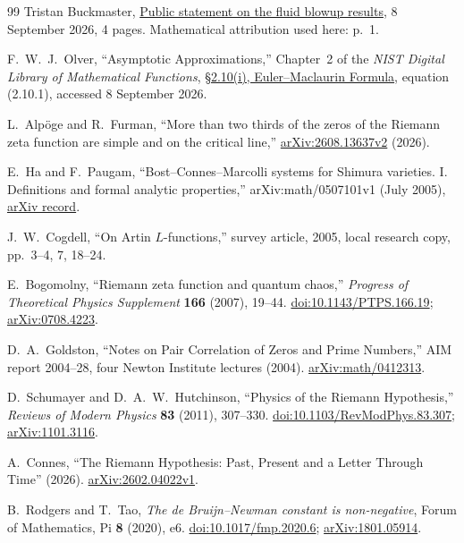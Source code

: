 \begin{thebibliography}{99}
Tristan Buckmaster,
\href{https://cims.nyu.edu/~tristanb/statement.pdf}{Public statement
on the fluid blowup results}, 8 September 2026, 4 pages.
Mathematical attribution used here: p.~1.

F.~W.~J.~Olver,
``Asymptotic Approximations,'' Chapter~2 of the
\emph{NIST Digital Library of Mathematical Functions},
\href{https://dlmf.nist.gov/2.10}{\S2.10(i), Euler--Maclaurin Formula},
equation (2.10.1), accessed 8 September 2026.

L.~Alp\"oge and R.~Furman,
``More than two thirds of the zeros of the Riemann zeta function are simple
and on the critical line,''
\href{https://arxiv.org/abs/2608.13637v2}{arXiv:2608.13637v2} (2026).

E.~Ha and F.~Paugam,
``Bost--Connes--Marcolli systems for Shimura varieties. I. Definitions and
formal analytic properties,''
arXiv:math/0507101v1 (July 2005),
\href{https://arxiv.org/abs/math/0507101}{arXiv record}.

J.~W.~Cogdell,
``On Artin $L$-functions,'' survey article, 2005,
local research copy, pp.~3--4, 7, 18--24.
\small\raggedright

E.~Bogomolny,
``Riemann zeta function and quantum chaos,''
\emph{Progress of Theoretical Physics Supplement} \textbf{166} (2007), 19--44.
\href{https://doi.org/10.1143/PTPS.166.19}{doi:10.1143/PTPS.166.19};
\href{https://arxiv.org/abs/0708.4223}{arXiv:0708.4223}.

D.~A.~Goldston,
``Notes on Pair Correlation of Zeros and Prime Numbers,''
AIM report 2004--28, four Newton Institute lectures (2004).
\href{https://arxiv.org/abs/math/0412313}{arXiv:math/0412313}.

D.~Schumayer and D.~A.~W.~Hutchinson,
``Physics of the Riemann Hypothesis,''
\emph{Reviews of Modern Physics} \textbf{83} (2011), 307--330.
\href{https://doi.org/10.1103/RevModPhys.83.307}{doi:10.1103/RevModPhys.83.307};
\href{https://arxiv.org/abs/1101.3116}{arXiv:1101.3116}.

A.~Connes,
``The Riemann Hypothesis: Past, Present and a Letter Through Time'' (2026).
\href{https://arxiv.org/abs/2602.04022}{arXiv:2602.04022v1}.

B.~Rodgers and T.~Tao,
\emph{The de Bruijn--Newman constant is non-negative},
Forum of Mathematics, Pi \textbf{8} (2020), e6.
\href{https://doi.org/10.1017/fmp.2020.6}{doi:10.1017/fmp.2020.6};
\href{https://arxiv.org/abs/1801.05914}{arXiv:1801.05914}.


\end{thebibliography}
